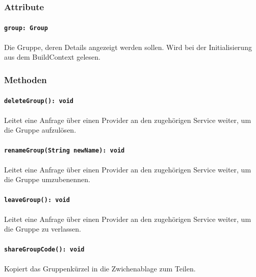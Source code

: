 \documentclass{entwurfsheft}
\begin{document}
\begin{sloppypar}
\subsubsection*{Attribute}
\paragraph{\texttt{group: Group}}
Die Gruppe, deren Details angezeigt werden sollen. Wird bei der Initialisierung aus dem \Gls{BuildContext} gelesen.
\subsubsection*{Methoden}
\paragraph{\texttt{deleteGroup(): void}}
Leitet eine Anfrage über einen Provider an den zugehörigen Service weiter, um die Gruppe aufzulösen.
\paragraph{\texttt{renameGroup(String newName): void}}
Leitet eine Anfrage über einen Provider an den zugehörigen Service weiter, um die Gruppe umzubenennen.
\paragraph{\texttt{leaveGroup(): void}}
Leitet eine Anfrage über einen Provider an den zugehörigen Service weiter, um die Gruppe zu verlassen.
\paragraph{\texttt{shareGroupCode(): void}}
Kopiert das Gruppenkürzel in die Zwichenablage zum Teilen.
\newpage

\end{sloppypar}
\end{document}
